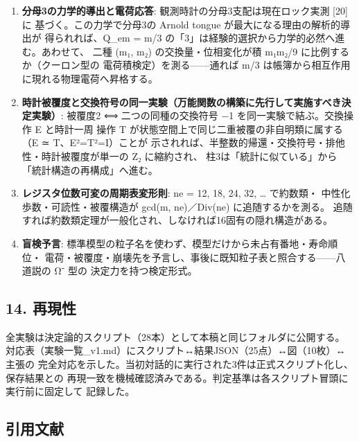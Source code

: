\documentclass[
]{ltjsarticle}
\providecommand{\tightlist}{%
  \setlength{\itemsep}{0pt}\setlength{\parskip}{0pt}}
\begin{document}
\begin{enumerate}
\def\labelenumi{\arabic{enumi}.}
\tightlist
\item
  \textbf{分母3の力学的導出と電荷応答}:
  観測時計の分母3支配は現在ロック実測 {[}20{]} に
  基づく。この力学で分母3の Arnold tongue が最大になる理由の解析的導出が
  得られれば、Q\_em = m/3
  の「3」は経験的選択から力学的必然へ進む。あわせて、 二種 (m₁, m₂)
  の交換量・位相変化が積 m₁m₂/9 に比例するか（クーロン型の
  電荷積検定）を測る------通れば m/3
  は帳簿から相互作用に現れる物理電荷へ昇格する。
\item
  \textbf{時計被覆度と交換符号の同一実験（万能関数の構築に先行して実施すべき決定実験）}:
  被覆度2 ⟺ 二つの同種の交換符号 −1 を同一実験で結ぶ。交換操作 E
  と時計一周 操作 T が状態空間上で同じ二重被覆の非自明類に属する（E ≃
  T、E²=T²=I）ことが
  示されれば、半整数的帰還・交換符号・排他性・時計被覆度が単一の Z₂
  に縮約され、 柱3は「統計に似ている」から「統計構造の再構成」へ進む。
\item
  \textbf{レジスタ位数可変の周期表変形則}: ne = 12, 18, 24, 32, \ldots{}
  で約数類・ 中性化歩数・可読性・被覆構造が gcd(m, ne)／Div(ne)
  に追随するかを測る。
  追随すれば約数類定理が一般化され、しなければ16固有の隠れ構造がある。
\item
  \textbf{盲検予言}:
  標準模型の粒子名を使わず、模型だけから未占有番地・寿命順位・
  電荷・被覆度・崩壊先を予言し、事後に既知粒子表と照合する------八道説の
  Ω⁻ 型の 決定力を持つ検定形式。
\end{enumerate}

\subsection{14. 再現性}\label{ux518dux73feux6027}

全実験は決定論的スクリプト（28本）として本稿と同じフォルダに公開する。
対応表（実験一覧\_v1.md）にスクリプト↔結果JSON（25点）↔図（10枚）↔主張の
完全対応を示した。当初対話的に実行された3件は正式スクリプト化し、保存結果との
再現一致を機械確認済みである。判定基準は各スクリプト冒頭に実行前に固定して
記録した。

\subsection{引用文献}\label{ux5f15ux7528ux6587ux732e}
\end{document}
